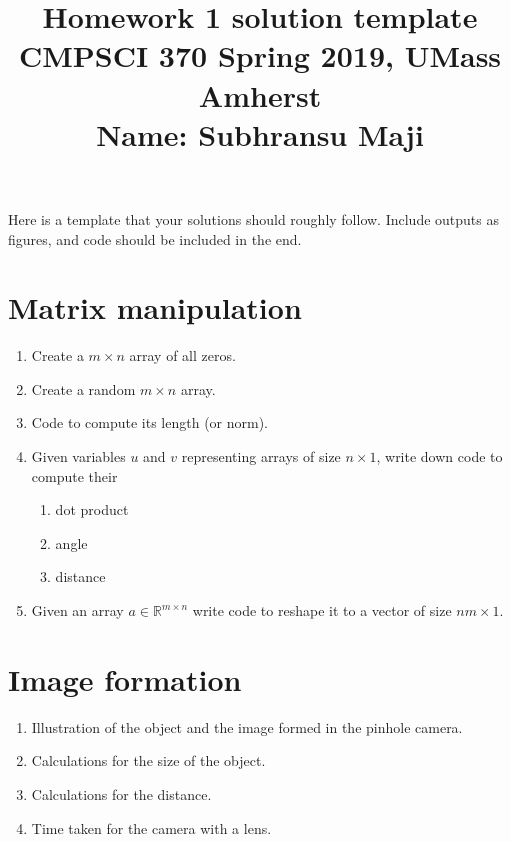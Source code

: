 \documentclass[10pt,letterpaper]{article}
\title{
  Homework 1 solution template\\
  \Large{CMPSCI 370 Spring 2019, UMass Amherst} \\
  \Large{Name: Subhransu Maji} \\
}
\date{}
\begin{document}
\maketitle

\renewcommand\thesubsection{\thesection.\alph{subsection}}

Here is a template that your solutions should roughly follow. Include outputs as figures, and code should be included in the end.

\section{Matrix manipulation}
\begin{enumerate}
\item Create a $m \times n$ array of all zeros.
\vspace{1in}
\item Create a random $m \times n$ array.
\vspace{1in}
\item Code to compute its length (or norm).
\vspace{1in}

\item  Given variables $u$ and $v$ representing arrays of size $n \times 1$, write down code to compute their
\begin{enumerate}
\item dot product
\vspace{1in}
\item angle
\vspace{1in}
\item distance
\vspace{1in}
\end{enumerate}
\item Given an array $a \in \mathbb{R}^{m\times n}$ write code to reshape it to a vector of size $nm \times 1$.
\vspace{1in}
\end{enumerate}


\section{Image formation}

\begin{enumerate}
\item Illustration of the object and the image formed in the pinhole camera. 
\vspace{2in}
\item Calculations for the size of the object.
\vspace{1in}
\item Calculations for the distance.
\vspace{1in}
\item Time taken for the camera with a lens.
\vspace{1in}
\end{enumerate}
\end{document}
